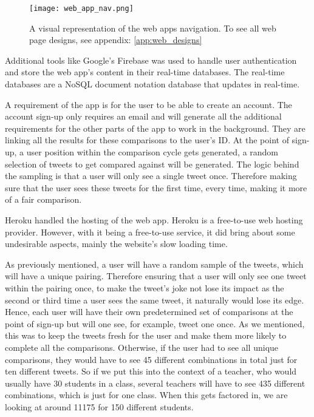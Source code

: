	\begin{figure}[t]
		\centering
		\texttt{[image: web\_app\_nav.png]}
		\caption{A visual representation of the web apps navigation. To see all web page designs, see appendix: \ref{app:web_designs}}
		\label{fig:web_app_nav}
		
	\end{figure}
	
	Additional tools like Google's Firebase \cite{moroney2017firebase} was used to handle user authentication and store the web app's content in their real-time databases. The real-time databases are a NoSQL document notation database that updates in real-time. 
	
	A requirement of the app is for the user to be able to create an account. The account sign-up only requires an email and will generate all the additional requirements for the other parts of the app to work in the background. They are linking all the results for these comparisons to the user's ID. At the point of sign-up, a user position within the comparison cycle gets generated, a random selection of tweets to get compared against will be generated. The logic behind the sampling is that a user will only see a single tweet once. Therefore making sure that the user sees these tweets for the first time, every time, making it more of a fair comparison.
	
	Heroku \cite{middleton2013heroku} handled the hosting of the web app. Heroku is a free-to-use web hosting provider. However, with it being a free-to-use service, it did bring about some undesirable aspects, mainly the website's slow loading time.
	
	As previously mentioned, a user will have a random sample of the tweets, which will have a unique pairing. Therefore ensuring that a user will only see one tweet within the pairing once, to make the tweet's joke not lose its impact as the second or third time a user sees the same tweet, it naturally would lose its edge. Hence, each user will have their own predetermined set of comparisons at the point of sign-up but will one see, for example, tweet one once. As we mentioned, this was to keep the tweets fresh for the user and make them more likely to complete all the comparisons. Otherwise, if the user had to see all unique comparisons, they would have to see 45 different combinations in total just for ten different tweets. So if we put this into the context of a teacher, who would usually have 30 students in a class, several teachers will have to see 435 different combinations, which is just for one class. When this gets factored in, we are looking at around 11175 for 150 different students.
	
